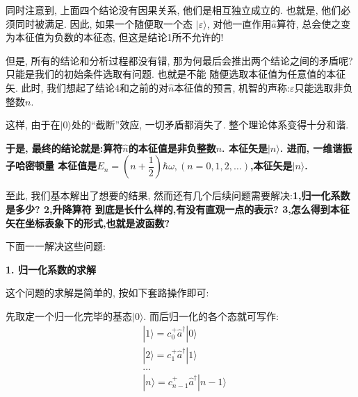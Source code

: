 \documentclass[a4paper, 11pt]{article}
\begin{document}
\begin{spacing}{1.2}
        同时注意到, 上面四个结论没有因果关系, 他们是相互独立成立的. 也就是, 他们必须同时被满足. 因此, 如果一个随便取一个态
        $|\varepsilon\rangle$, 对他一直作用$\hat{a}$算符, 总会使之变为本征值为负数的本征态, 但这是结论1所不允许的!
        
        但是, 所有的结论和分析过程都没有错, 那为何最后会推出两个结论之间的矛盾呢? 只能是我们的初始条件选取有问题. 也就是不能
        随便选取本征值为任意值的本征矢. 此时, 我们想起了结论4和之前的对$\hat{n}$本征值的预言, 
        机智的声称:$\varepsilon$只能选取非负整数$n$. 

        这样, 由于在$|0\rangle$处的``截断''效应, 一切矛盾都消失了. 整个理论体系变得十分和谐.

        \textbf{于是, 最终的结论就是:算符$\hat{n}$的本征值是非负整数$n$. 本征矢是$|n\rangle$. 进而, 一维谐振子哈密顿量
        本征值是$E_n = \left(n+\dfrac{1}{2}\right)\hbar\omega, (n=0,1,2,\ldots)$,本征矢是$|n\rangle$.}

        至此, 我们基本解出了想要的结果, 然而还有几个后续问题需要解决:\textbf{1,归一化系数是多少? 2,升降算符
        到底是长什么样的,有没有直观一点的表示? 3,怎么得到本征矢在坐标表象下的形式,也就是波函数?}

        下面一一解决这些问题:
        
        \textbf{1. 归一化系数的求解}

        这个问题的求解是简单的, 按如下套路操作即可:

        先取定一个归一化完毕的基态$|0\rangle$. 而后归一化的各个态就可写作:
        \begin{equation}
          \begin{aligned}
            &|1\rangle = c_0^+\hat{a}^{\dagger}|0\rangle\\
            &|2\rangle = c_1^+\hat{a}^{\dagger}|1\rangle\\
            &\ldots\\
            &|n\rangle = c_{n-1}^+\hat{a}^{\dagger}|n-1\rangle\\
          \end{aligned}
        \end{equation}
        

\end{spacing}
\end{document}
